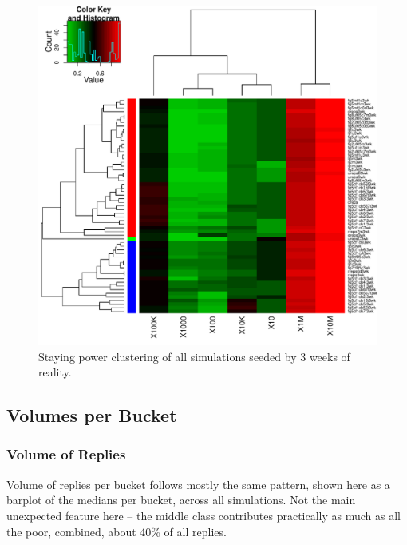 \documentclass[10pt,oneside]{memoir}
\begin{document}
\begin{figure}
\begin{center}
    \includegraphics{figures/heatmap-srates-medians-3wk}
    \caption{Staying power clustering of all simulations seeded by 3 weeks of reality.}
    \label{figure:heatmap-srates-medians-3wk}
\end{center}
\end{figure}
\pagebreak \subsection{Volumes per Bucket}
\label{volumesperbucket}

\subsubsection{Volume of Replies}
\label{volumeofreplies}

Volume of replies per bucket follows mostly the same pattern, shown here as a barplot of the medians per bucket, across all simulations.   Not the main unexpected feature here -- the middle class contributes practically as much as all the poor, combined, about 40\% of all replies.
\end{document}
